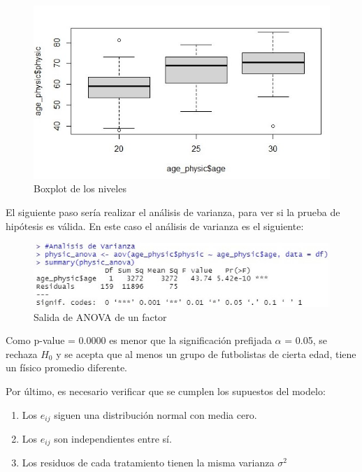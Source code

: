 \documentclass[a4paper,10pt,twocolumn]{article}
\begin{document}
\begin{figure}[h]
	\includegraphics[scale=0.55]{./imgs/anova_boxplot.jpg}
	\caption{Boxplot de los niveles}
\end{figure}

El siguiente paso sería realizar el análisis de varianza, para ver si la prueba de hipótesis es válida. En este caso el análisis de varianza es el siguiente:

\begin{figure}[h]
	\includegraphics[scale=0.55]{./imgs/anova_summary.jpg}
	\caption{Salida de ANOVA de un factor}
\end{figure}

Como p-value = 0.0000 es menor que la significación prefijada $\alpha$ = 0.05, se rechaza $H_{0}$ y se acepta que al menos un grupo de futbolistas de cierta edad, tiene un físico promedio diferente. 

Por último, es necesario verificar que se cumplen los supuestos del modelo:
\begin{enumerate}
	\item Los $e_{ij}$ siguen una distribución normal con media cero.
	\item Los $e_{ij}$ son independientes entre sí.
	\item Los residuos de cada tratamiento tienen la misma varianza $\sigma^{2}$
\end{enumerate}
\end{document}
